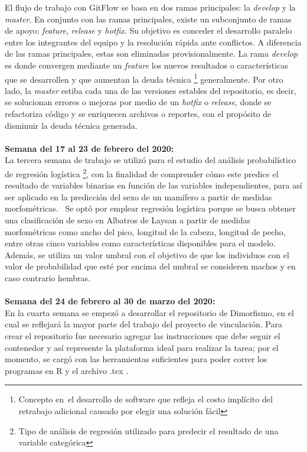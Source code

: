 \documentclass{article}
\begin{document}
     El flujo de trabajo con GitFlow se basa en dos ramas principales: la \textit{develop} y la \textit{master}. En conjunto con las ramas principales, existe un subconjunto de ramas de apoyo: \textit{feature}, \textit{release} y \textit{hotfix}. Su objetivo es conceder el desarrollo paralelo entre los integrantes del equipo y la resolución rápida ante conflictos. A diferencia de las ramas principales, estas son eliminadas provisionalmente.
    La rama \textit{develop} es donde convergen mediante un \textit{feature} los nuevos resultados o características que se desarrollen y que aumentan la deuda técnica \footnote{Concepto en el desarrollo de software que refleja el costo implícito del retrabajo adicional causado por elegir una solución fácil} generalmente. Por otro lado, la \textit{master} estiba cada una de las versiones estables del repositorio, es decir, se solucionan errores o mejoras por medio de un \textit{hotfix} o \textit{release}, donde se refactoriza código y se enriquecen archivos o reportes, con el propósito de disminuir la deuda técnica generada. 
    \\ \\ 
    \textbf{Semana del 17 al 23 de febrero del 2020:} \\
   La tercera semana de trabajo se utilizó para el estudio del análisis probabilístico de regresión logística \footnote{Tipo de análisis de regresión utilizado para predecir el resultado de una variable categórica}, con la finalidad de comprender cómo este predice el resultado de variables binarias en función de las variables independientes, para así ser aplicado en la predicción del sexo de un mamífero a partir de medidas morfométricas. 
    Se optó por emplear regresión logística porque se busca obtener una clasificación de sexo en Albatros de Laysan a partir de medidas morfométricas como ancho del pico, longitud de la cabeza, longitud de pecho, entre otras cinco variables como características disponibles para el modelo. Además, se utiliza un valor umbral con el objetivo de que los individuos con el valor de probabilidad que esté por encima del umbral se consideren machos y en caso contrario hembras.
\\ \\
    \textbf{Semana del 24 de febrero al 30 de marzo del 2020:} \\
    En la cuarta semana se empezó a desarrollar el repositorio de Dimorfismo, en el cual se reflejará la mayor parte del trabajo del proyecto de vinculación. Para crear el repositorio fue necesario agregar las instrucciones que debe seguir el contenedor y así represente la plataforma ideal para realizar la tarea; por el momento, se cargó con las herramientas suficientes para poder correr los programas en R y el archivo .tex .
\end{document}
